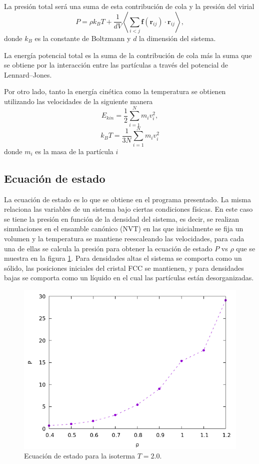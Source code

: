 \documentclass[a4paper,spanish,12pt,twoside]{article}
\begin{document}
La presión total será una suma de esta contribución de cola y la presión del virial
$$
P = \rho k_BT + \frac{1}{dV} \left\langle \sum_{i<j} \mathbf{f}(\mathbf{r}_{ij}) \cdot \mathbf{r}_{ij} \right\rangle,
$$
donde $k_B$ es la constante de Boltzmann y $d$ la dimensión del sistema.

La energía potencial total es la suma de la contribución de cola más la suma que se obtiene por la interacción entre las partículas a través del potencial de Lennard--Jones.

Por otro lado, tanto la energía cinética como la temperatura se obtienen utilizando las velocidades de la siguiente manera
$$
E_{kin} = \frac{1}{2} \sum_{i=1}^N m_i v_i^2,
$$
$$
k_BT = \frac{1}{3N} \sum_{i=1}^{N} m_i v_i^2
$$
donde $m_i$ es la masa de la partícula $i$

\subsection{Ecuación de estado}

La ecuación de estado es lo que se obtiene en el programa presentado. La misma relaciona las variables de un sistema bajo ciertas condiciones físicas. En este caso se tiene la presión en función de la densidad del sistema, es decir, se realizan simulaciones en el ensamble canónico (NVT) en las que inicialmente se fija un volumen y la temperatura se mantiene reescaleando las velocidades, para cada una de ellas se calcula la presión para obtener la ecuación de estado $P$ vs $\rho$ que se muestra en la figura \ref{fig:eos}. Para densidades altas el sistema se comporta como un sólido, las posiciones iniciales del cristal FCC se mantienen, y para densidades bajas se comporta como un líquido en el cual las partículas están desorganizadas.

\begin{figure}[h]
	\centering
	\includegraphics[width=.7\textwidth]{eos.png}
	\caption{Ecuación de estado para la isoterma $T=2.0$.}
	\label{fig:eos}
\end{figure}
\end{document}
